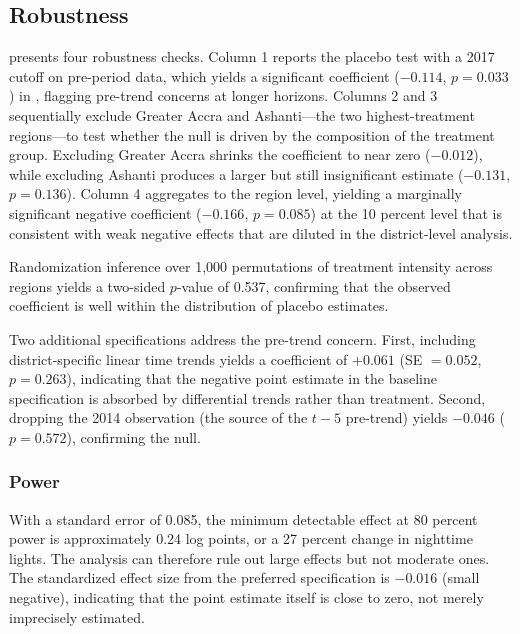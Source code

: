 \documentclass[12pt]{article}
\begin{document}


\subsection{Robustness}

 presents four robustness checks. Column 1 reports the placebo test with a 2017 cutoff on pre-period data, which yields a significant coefficient ($-0.114$, $p = 0.033$) in , flagging pre-trend concerns at longer horizons. Columns 2 and 3 sequentially exclude Greater Accra and Ashanti---the two highest-treatment regions---to test whether the null is driven by the composition of the treatment group. Excluding Greater Accra shrinks the coefficient to near zero ($-0.012$), while excluding Ashanti produces a larger but still insignificant estimate ($-0.131$, $p = 0.136$). Column 4 aggregates to the region level, yielding a marginally significant negative coefficient ($-0.166$, $p = 0.085$) at the 10 percent level that is consistent with weak negative effects that are diluted in the district-level analysis.

Randomization inference over 1,000 permutations of treatment intensity across regions yields a two-sided $p$-value of 0.537, confirming that the observed coefficient is well within the distribution of placebo estimates.

Two additional specifications address the pre-trend concern. First, including district-specific linear time trends yields a coefficient of $+0.061$ (SE $= 0.052$, $p = 0.263$), indicating that the negative point estimate in the baseline specification is absorbed by differential trends rather than treatment. Second, dropping the 2014 observation (the source of the $t-5$ pre-trend) yields $-0.046$ ($p = 0.572$), confirming the null.

\subsubsection*{Power} With a standard error of 0.085, the minimum detectable effect at 80 percent power is approximately 0.24 log points, or a 27 percent change in nighttime lights. The analysis can therefore rule out large effects but not moderate ones. The standardized effect size from the preferred specification is $-0.016$ (small negative), indicating that the point estimate itself is close to zero, not merely imprecisely estimated.


\end{document}
